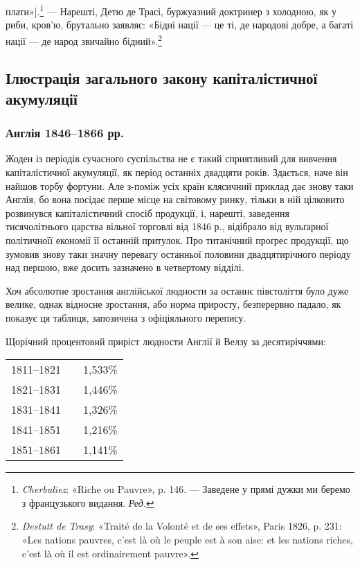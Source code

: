 \parcont{}  %
плати»].\footnote*{
\emph{Cherbuliez}: «Riche ou Pauvre», p. 146. — Заведене у прямі дужки
ми беремо з французького видання. \emph{Ред.}
} — Нарешті, Детю де Трасі, буржуазний доктринер з
холодною, як у риби, кров’ю, брутально заявляє: «Бідні нації —
це ті, де народові добре, а багаті нації — де народ звичайно бідний».\footnote{
\emph{Destutt de Trasy}: «Traité de la Volonté et de ses effets», Paris
1826, p. 231: «Les nations pauvres, c’est là où le peuple est à son aise: et
les nations riches, c’est là où il est ordinairement pauvre».
}

\subsection{Ілюстрація загального закону капіталістичної акумуляції}

\subsubsection{Англія 1846--1866 рр.}

Жоден із періодів сучасного суспільства не є такий сприятливий
для вивчення капіталістичної акумуляції, як період останніх
двадцяти років. Здається, наче він найшов торбу фортуни.
Але з-поміж усіх країн клясичний приклад дає знову таки
Англія, бо вона посідає перше місце на світовому ринку,
тільки в ній цілковито розвинувся капіталістичний спосіб продукції,
і, нарешті, заведення тисячолітнього царства вільної
торговлі від 1846 р., відібрало від вульґарної політичноїї економії
її останній притулок. Про титанічний проґрес продукції, що зумовив
знову таки значну перевагу останньої половини двадцятирічного
періоду над першою, вже досить зазначено в четвертому
відділі.

Хоч абсолютне зростання англійської людности за останнє півстоліття
було дуже велике, однак відносне зростання, або норма
приросту, безперервно падало, як показує ця таблиця, запозичена
з офіціяльного перепису.

Щорічний процентовий приріст людности Англії й Велзу
за десятиріччями:

\begin{center}
\noindent\begin{tabularx}{0.4\textwidth}{l@{}X@{}D{,}{,}{3}}
   1811--1821 & \dotfill & 1,533\% \\
   1821--1831 & \dotfill & 1,446\% \\
   1831--1841 & \dotfill & 1,326\% \\
   1841--1851 & \dotfill & 1,216\% \\
   1851--1861 & \dotfill & 1,141\% \\
\end{tabularx}
\end{center}

